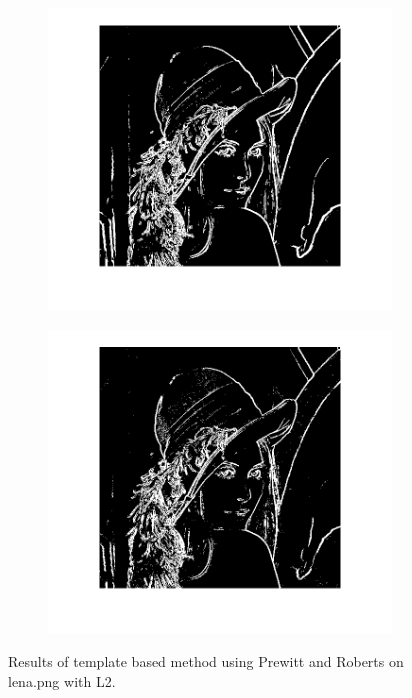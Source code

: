 \documentclass{article}
\begin{document}
\begin{figure}
        \centering
        \begin{subfigure}[b]{0.49\textwidth}
            \includegraphics[width=\textwidth]{Images/lena_prewitt_l2.png}
        \end{subfigure}
        \begin{subfigure}[b]{0.49\textwidth}
            \includegraphics[width=\textwidth]{Images/lena_roberts_l2.png}
        \end{subfigure}
        \caption{Results of template based method using Prewitt and Roberts on \textsf{lena.png} with L2.}
        \label{fig:temp_filters_lena}
\end{figure}
\end{document}
